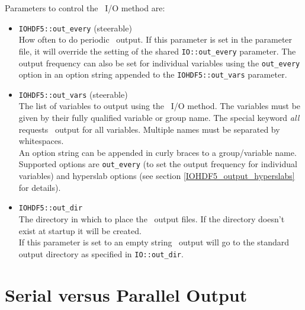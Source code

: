 \documentclass{article}
\begin{document}
Parameters to control the \ThisThorn\ I/O method are:
\begin{itemize}
  \item {\tt IOHDF5::out\_every} (steerable)\\
        How often to do periodic \ThisThorn\ output. If this parameter is set
        in the parameter file, it will override the setting of the shared
        {\tt IO::out\_every} parameter. The output frequency can also be set
        for individual variables using the {\tt out\_every} option in an option
        string appended to the {\tt IOHDF5::out\_vars} parameter.
  \item {\tt IOHDF5::out\_vars} (steerable)\\
        The list of variables to output using the \ThisThorn\ I/O method.
        The variables must be given by their fully qualified variable or group
        name. The special keyword {\it all} requests \ThisThorn\ output for
        all variables. Multiple names must be separated by whitespaces.\\
        An option string can be appended in curly braces to a group/variable
        name. Supported options are {\tt out\_every} (to set the output
        frequency for individual variables) and hyperslab options (see section
        \ref{IOHDF5_output_hyperslabs} for details).
  \item {\tt IOHDF5::out\_dir}\\
        The directory in which to place the \ThisThorn\ output files.
        If the directory doesn't exist at startup it will be created.\\
        If this parameter is set to an empty string \ThisThorn\ output will go
        to the standard output directory as specified in {\tt IO::out\_dir}.
\end{itemize}


\section{Serial versus Parallel Output}
\end{document}
